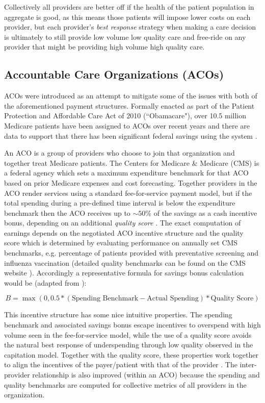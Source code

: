 \documentclass{article}
\begin{document}
Collectively all providers are better off if the health of the patient population in aggregate is good, as this means those patients will impose lower costs on each provider, but each provider's \emph{best response} strategy when making a care decision is ultimately to still provide low volume low quality care and free-ride on any provider that might be providing high volume high quality care.

\subsection{Accountable Care Organizations (ACOs)} \label{sec:aco}
ACOs were introduced as an attempt to mitigate some of the issues with both of the aforementioned payment structures. Formally enacted as part of the Patient Protection and Affordable Care Act of 2010 (``Obamacare"), over 10.5 million Medicare patients have been assigned to ACOs over recent years and there are data to support that there has been significant federal savings using the system \cite{acos}.

An ACO is a group of providers who choose to join that organization and together treat Medicare patients. The Centers for Medicare \& Medicare (CMS) is a federal agency which sets a maximum expenditure benchmark for that ACO based on prior Medicare expenses and cost forecasting. Together providers in the ACO render services using a standard fee-for-service payment model, but if the total spending during a pre-defined time interval is below the expenditure benchmark then the ACO receives up to ${\sim}50$\% of the savings as a cash incentive bonus, depending on an additional \emph{quality score} \cite{acos}. The exact computation of earnings depends on the negotiated ACO incentive structure and the quality score which is determined by evaluating performance on annually set CMS benchmarks, e.g. percentage of patients provided with preventative screening and influenza vaccination (detailed quality benchmarks can be found on the CMS website \cite{cms}). Accordingly a representative formula for savings bonus calculation would be (adapted from \cite{acos}):

\begin{equation}
    B = \max (0, 0.5 * (\text{Spending Benchmark} - \text{Actual Spending}) * \text{Quality Score})
\end{equation}

This incentive structure has some nice intuitive properties. The spending benchmark and associated savings bonus escape incentives to overspend with high volume seen in the fee-for-service model, while the use of a quality score avoids the natural best response of underspending through low quality observed in the capitation model. Together with the quality score, these properties work together to align the incentives of the payer/patient with that of the provider \cite{acoecon}. The inter-provider relationship is also improved (within an ACO) because the spending and quality benchmarks are computed for collective metrics of all providers in the organization.
\end{document}
